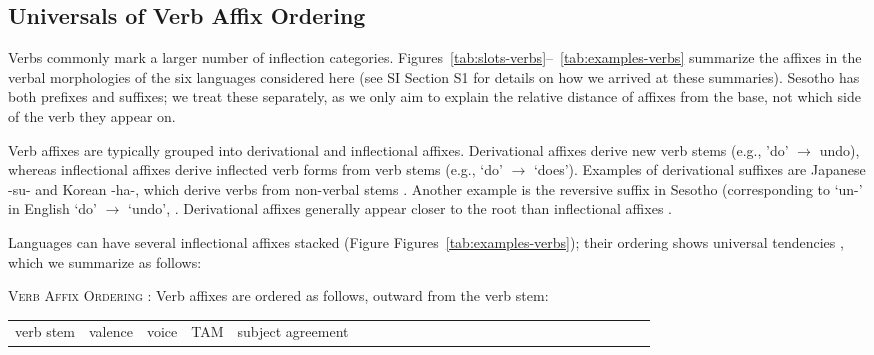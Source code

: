 \documentclass[11pt,letterpaper]{article}
\newcommand{\citep}{\parencite}
\begin{document}
\subsection{Universals of Verb Affix Ordering}\label{sec:univ-verbs}
Verbs commonly mark a larger number of inflection categories.
Figures~\ref{tab:slots-verbs}--~\ref{tab:examples-verbs} summarize the affixes in the verbal morphologies of the six languages considered here (see SI Section S1 for details on how we arrived at these summaries).
Sesotho has both prefixes and suffixes; we treat these separately, as we only aim to explain the relative distance of affixes from the base, not which side of the verb they appear on.

Verb affixes are typically grouped into derivational and inflectional affixes.
Derivational affixes derive new verb stems (e.g., 'do' $\rightarrow$ undo), whereas inflectional affixes derive inflected verb forms from verb stems (e.g., `do' $\rightarrow$ `does').
Examples of derivational suffixes are Japanese -su- and Korean -ha-, which derive verbs from non-verbal stems \citep{hasegawa2014japanese, yeon2010korean}.
Another example is the reversive suffix in Sesotho (corresponding to `un-' in English `do' $\rightarrow$ `undo', \citep{doke1967textbook}.
Derivational affixes generally appear closer to the root than inflectional affixes \citep{greenberg-universals-1963}.

Languages can have several inflectional affixes stacked (Figure Figures~\ref{tab:examples-verbs}); their ordering shows universal tendencies \citep{bybee-morphology-1985}, which we summarize as follows:

\begin{adjustwidth}{6em}{6em}
\textsc{Verb Affix Ordering} \citep{bybee-morphology-1985}:
Verb affixes are ordered as follows, outward from the verb stem:

\begin{tabular}{llllllllllllllllllllllllll}
verb stem & valence & voice & TAM & subject agreement
\end{tabular}
\end{adjustwidth}
\end{document}
